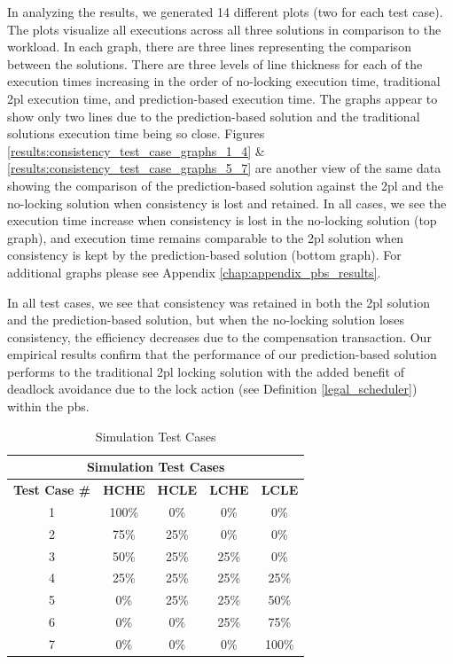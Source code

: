 In analyzing the results, we generated 14 different plots (two for each test case). The plots visualize all executions across all three solutions in comparison to the workload. In each graph, there are three lines representing the comparison between the solutions. There are three levels of line thickness for each of the execution times increasing in the order of no-locking execution time, traditional \gls{2pl} execution time, and prediction-based execution time. The graphs appear to show only two lines due to the prediction-based solution and the traditional solutions execution time being so close. Figures \ref{results:consistency_test_case_graphs_1_4} \& \ref{results:consistency_test_case_graphs_5_7} are another view of the same data showing the comparison of the prediction-based solution against the \gls{2pl} and the no-locking solution when consistency is lost and retained. In all cases, we see the execution time increase when consistency is lost in the no-locking solution (top graph), and execution time remains comparable to the \gls{2pl} solution when consistency is kept by the prediction-based solution (bottom graph). For additional graphs please see Appendix \ref{chap:appendix_pbs_results}.

In all test cases, we see that consistency was retained in both the \gls{2pl} solution and the prediction-based solution, but when the no-locking solution loses consistency, the efficiency decreases due to the compensation transaction. Our empirical results confirm that the performance of our prediction-based solution performs to the traditional \gls{2pl} locking solution with the added benefit of deadlock avoidance due to the lock action (see Definition \ref{legal_scheduler}) within the \gls{pbs}.

\begin{table}[h]
\caption{Simulation Test Cases} %
\captionsetup{justification=centering}
\centering
\begin{tabular}{|c|c|c|c|c|}
\hline
\multicolumn{5}{|c|}{\cellcolor[HTML]{EFEFEF}\textbf{Simulation Test Cases}}                                                   \\ \hline
\textbf{Test Case \#} & \textbf{HCHE} & \textbf{HCLE} & \textbf{LCHE} & \textbf{LCLE} \\ \hline
1 & 100\% & 0\% & 0\% & 0\% \\ \hline
2 & 75\% & 25\% & 0\% & 0\% \\ \hline
3 & 50\% & 25\% & 25\% & 0\% \\ \hline
4 & 25\% & 25\% & 25\% & 25\% \\ \hline
5 & 0\% & 25\% & 25\% & 50\% \\ \hline
6 & 0\% & 0\% & 25\% & 75\% \\ \hline
7 & 0\% & 0\% & 0\% & 100\% \\ \hline
\end{tabular}

\label{tbl:sim_test_cases} %

\end{table}

